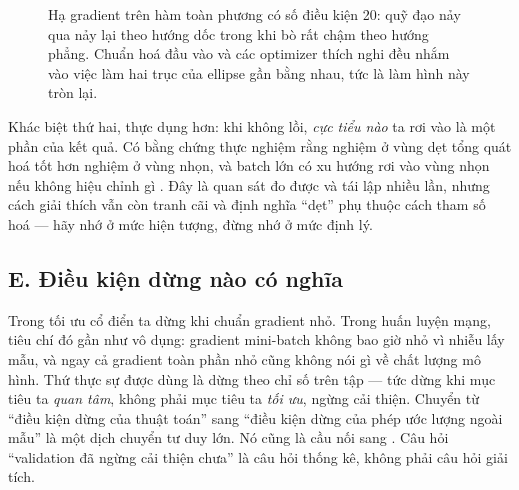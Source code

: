 \documentclass[../../../deep_learning.tex]{subfiles}
\begin{document}
\begin{figure}[H]\centering
{}
\caption{Hạ gradient trên hàm toàn phương có số điều kiện 20: quỹ đạo nảy qua nảy lại theo hướng dốc trong khi bò rất chậm theo hướng phẳng. Chuẩn hoá đầu vào và các optimizer thích nghi đều nhắm vào việc làm hai trục của ellipse gần bằng nhau, tức là làm hình này tròn lại.}
\label{fig:zigzag}
\end{figure}

Khác biệt thứ hai, thực dụng hơn: khi không lồi, \emph{cực tiểu nào} ta rơi vào là một phần của kết quả. Có bằng chứng thực nghiệm rằng nghiệm ở vùng dẹt tổng quát hoá tốt hơn nghiệm ở vùng nhọn, và batch lớn có xu hướng rơi vào vùng nhọn nếu không hiệu chỉnh gì \cite{keskar2017large}. Đây là quan sát đo được và tái lập nhiều lần, nhưng cách giải thích vẫn còn tranh cãi và định nghĩa ``dẹt'' phụ thuộc cách tham số hoá --- hãy nhớ ở mức hiện tượng, đừng nhớ ở mức định lý.

\subsection{E. Điều kiện dừng nào có nghĩa}
Trong tối ưu cổ điển ta dừng khi chuẩn gradient nhỏ. Trong huấn luyện mạng, tiêu chí đó gần như vô dụng: gradient mini-batch không bao giờ nhỏ vì nhiễu lấy mẫu, và ngay cả gradient toàn phần nhỏ cũng không nói gì về chất lượng mô hình. Thứ thực sự được dùng là dừng theo chỉ số trên tập  --- tức dừng khi mục tiêu ta \emph{quan tâm}, không phải mục tiêu ta \emph{tối ưu}, ngừng cải thiện. 
Chuyển từ ``điều kiện dừng của thuật toán'' sang ``điều kiện dừng của phép ước lượng ngoài mẫu'' là một dịch chuyển tư duy lớn. Nó cũng là cầu nối sang . Câu hỏi ``validation đã ngừng cải thiện chưa'' là câu hỏi thống kê, không phải câu hỏi giải tích.
\end{document}
